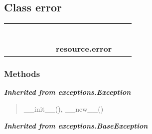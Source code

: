 

\subsection{Class error}

    \label{resource:error}
\begin{tabular}{cccccccccc}
\multicolumn{2}{r}{\settowidth{\BCL}{object}\multirow{2}{\BCL}{object}}
&&
&&
&&
  \\\cline{3-3}
  &&\multicolumn{1}{c|}{}
&&
&&
&&
  \\
\multicolumn{4}{r}{\settowidth{\BCL}{exceptions.BaseException}\multirow{2}{\BCL}{exceptions.BaseException}}
&&
&&
  \\\cline{5-5}
  &&&&\multicolumn{1}{c|}{}
&&
&&
  \\
\multicolumn{6}{r}{\settowidth{\BCL}{exceptions.Exception}\multirow{2}{\BCL}{exceptions.Exception}}
&&
  \\\cline{7-7}
  &&&&&&\multicolumn{1}{c|}{}
&&
  \\
&&&&&&\multicolumn{2}{l}{\textbf{resource.error}}
\end{tabular}



  \subsubsection{Methods}


\large{\textbf{\textit{Inherited from exceptions.Exception}}}

\begin{quote}
\_\_init\_\_(), \_\_new\_\_()
\end{quote}

\large{\textbf{\textit{Inherited from exceptions.BaseException}}}


